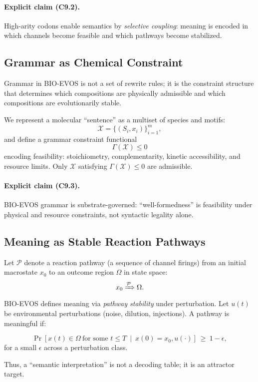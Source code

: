 \documentclass[11pt]{article}
\begin{document}
\paragraph{Explicit claim (C9.2).}
High-arity codons enable semantics by \emph{selective coupling}: meaning is encoded in
which channels become feasible and which pathways become stabilized.

\subsection{Grammar as Chemical Constraint}
\label{sec:grammar-as-constraint}

Grammar in BIO-EVOS is not a set of rewrite rules; it is the constraint structure that
determines which compositions are physically admissible and which compositions are
evolutionarily stable.

We represent a molecular ``sentence'' as a multiset of species and motifs:
\[
\mathcal{X} = \{(S_i, x_i)\}_{i=1}^m,
\]
and define a grammar constraint functional
\[
\Gamma(\mathcal{X}) \le 0
\]
encoding feasibility: stoichiometry, complementarity, kinetic accessibility, and
resource limits. Only $\mathcal{X}$ satisfying $\Gamma(\mathcal{X})\le 0$ are admissible.

\paragraph{Explicit claim (C9.3).}
BIO-EVOS grammar is substrate-governed: ``well-formedness'' is feasibility under
physical and resource constraints, not syntactic legality alone.

\subsection{Meaning as Stable Reaction Pathways}
\label{sec:meaning-as-pathways}

Let $\mathcal{P}$ denote a reaction pathway (a sequence of channel firings) from an
initial macrostate $x_0$ to an outcome region $\Omega$ in state space:
\[
x_0 \xRightarrow{\mathcal{P}} \Omega.
\]
BIO-EVOS defines meaning via \emph{pathway stability} under perturbation. Let $u(t)$ be
environmental perturbations (noise, dilution, injections). A pathway is meaningful if:

\[
\Pr\!\left[x(t)\in \Omega \ \text{for some } t\le T \ \middle|\ x(0)=x_0, u(\cdot)\right]
\ \ge\ 1-\epsilon,
\]
for a small $\epsilon$ across a perturbation class.

Thus, a ``semantic interpretation'' is not a decoding table; it is an attractor target.
\end{document}
